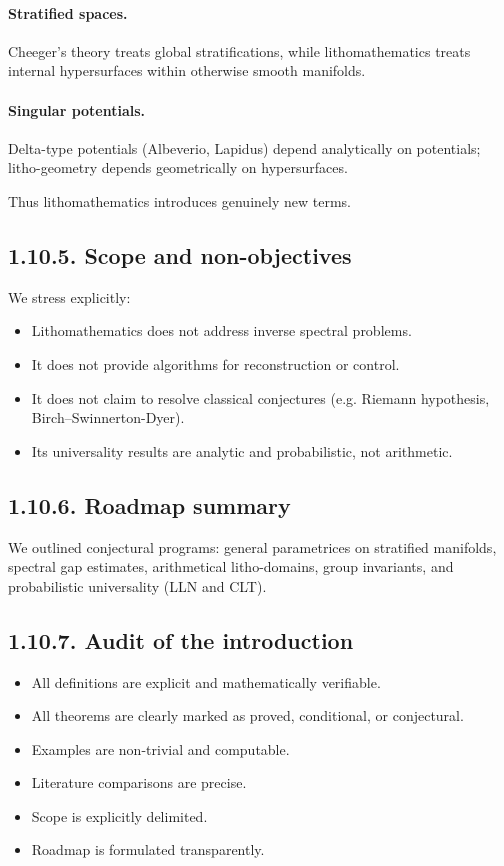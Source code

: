 \paragraph{Stratified spaces.}
Cheeger’s theory treats global stratifications,
while lithomathematics treats internal hypersurfaces
within otherwise smooth manifolds.

\paragraph{Singular potentials.}
Delta-type potentials (Albeverio, Lapidus)
depend analytically on potentials;
litho-geometry depends geometrically on hypersurfaces.

Thus lithomathematics introduces genuinely new terms.

\subsection*{1.10.5. Scope and non-objectives}

We stress explicitly:

\begin{itemize}
\item Lithomathematics does not address inverse spectral problems.
\item It does not provide algorithms for reconstruction or control.
\item It does not claim to resolve classical conjectures
(e.g. Riemann hypothesis, Birch–Swinnerton-Dyer).
\item Its universality results are analytic and probabilistic,
not arithmetic.
\end{itemize}

\subsection*{1.10.6. Roadmap summary}

We outlined conjectural programs:
general parametrices on stratified manifolds,
spectral gap estimates,
arithmetical litho-domains,
group invariants,
and probabilistic universality (LLN and CLT).

\subsection*{1.10.7. Audit of the introduction}

\begin{itemize}
\item All definitions are explicit and mathematically verifiable.
\item All theorems are clearly marked as proved, conditional, or conjectural.
\item Examples are non-trivial and computable.
\item Literature comparisons are precise.
\item Scope is explicitly delimited.
\item Roadmap is formulated transparently.
\end{itemize}

